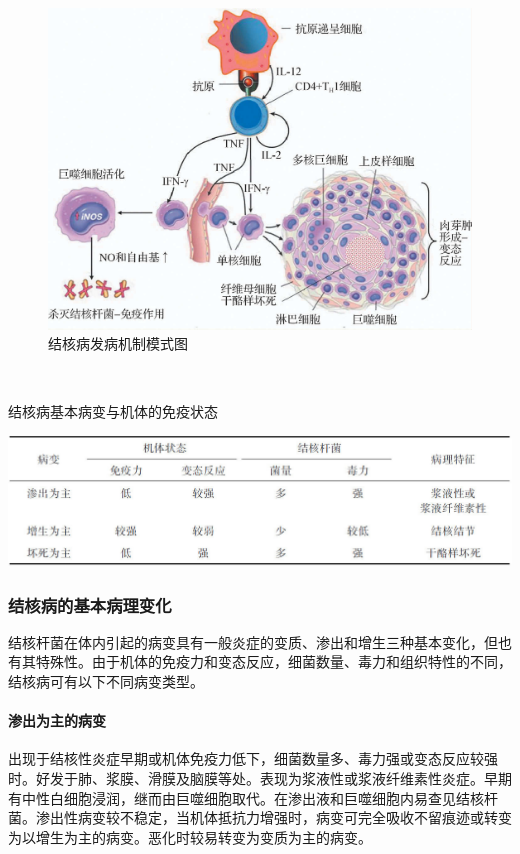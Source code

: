 \begin{figure}[!htbp]
    \centering
    \includegraphics{./images/Image00224.jpg}
    \captionsetup{justification=centering}
    \caption{结核病发病机制模式图}
    \label{fig14-1}
\end{figure}
　
\begin{table}[ht]
	\caption{结核病基本病变与机体的免疫状态}
	\label{tab14-1}
	\centering
	\includegraphics{./images/Image00225.jpg}
\end{table}


\subsubsection{结核病的基本病理变化}

结核杆菌在体内引起的病变具有一般炎症的变质、渗出和增生三种基本变化，但也有其特殊性。由于机体的免疫力和变态反应，细菌数量、毒力和组织特性的不同，结核病可有以下不同病变类型。

\paragraph{渗出为主的病变}
出现于结核性炎症早期或机体免疫力低下，细菌数量多、毒力强或变态反应较强时。好发于肺、浆膜、滑膜及脑膜等处。表现为浆液性或浆液纤维素性炎症。早期有中性白细胞浸润，继而由巨噬细胞取代。在渗出液和巨噬细胞内易查见结核杆菌。渗出性病变较不稳定，当机体抵抗力增强时，病变可完全吸收不留痕迹或转变为以增生为主的病变。恶化时较易转变为变质为主的病变。

